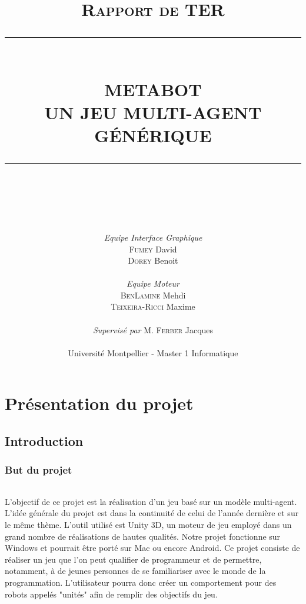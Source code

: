 \documentclass{report}
\newcommand{\HRule}[1]{\rule{\linewidth}{#1}}
\begin{document}
\title{\normalsize \textsc{Rapport de TER}
		\\ [1.5cm]
		\HRule{0.5pt} \\
		\LARGE \textbf{\uppercase{Metabot\\Un jeu multi-agent générique}}\\\HRule{0.5pt} \\}

\date{}

\author{\\[0.5cm] \textit{Equipe Interface Graphique}\\
		\textsc{Fumey} David \\
	\textsc{Dorey} Benoit \\[0.15cm] \\
	\textit{Equipe Moteur} \\	
	\textsc{BenLamine} Mehdi \\
	\textsc{Teixeira-Ricci} Maxime \\ [0.15cm] \\
	\textit{Supervisé par} M. \textsc{Ferber} Jacques\\ [2.5cm]\\
	Université Montpellier - Master 1 Informatique}

\maketitle

\newpage
\newpage
\tableofcontents
\newpage

\part{Présentation du projet}
\chapter{Introduction}
\section{But du projet}
\paragraph{}
L'objectif de ce projet est la réalisation d'un jeu basé sur un modèle multi-agent. L'idée générale du projet est dans la continuité de celui de l'année dernière et sur le même thème. L'outil utilisé est Unity 3D, un moteur de jeu employé dans un grand nombre de réalisations de hautes qualités. Notre projet fonctionne sur Windows et pourrait être porté sur Mac ou encore Android.
Ce projet consiste de réaliser un jeu que l'on peut qualifier de programmeur et de permettre, notamment, à de jeunes personnes de se familiariser avec le monde de la programmation. L'utilisateur pourra donc créer un comportement pour des robots appelés "unités" afin de remplir des objectifs du jeu.
\end{document}

